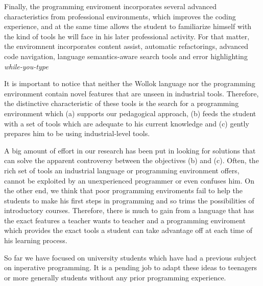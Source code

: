 Finally, the programming enviroment incorporates several advanced characteristics from professional environments, 
which improves the coding experience, and at the same time allows the student to familiarize himself with the kind of tools he will face in his later professional activity.
For that matter, the enviromnent incorporates content assist, automatic refactorings, advanced code navigation, 
language semantics-aware search tools and error highlighting \emph{while-you-type}

\medskip
It is important to notice that neither the Wollok language nor the programming environment contain novel features that are unseen in industrial tools.
Therefore, the distinctive characteristic of these tools is the search for a programming environment which 
(a) supports our pedagogical approach,
(b) feeds the student with a set of tools which are adequate to his current knowledge
and (c) gently prepares him to be using industrial-level tools.

A big amount of effort in our research has been put in looking for solutions that can solve the apparent controversy between the objectives (b) and (c).
Often, the rich set of tools an industrial language or programming environment offers, cannot be exploited by an unexperienced programmer or even confuses him.
On the other end, we think that poor programming enviroments fail to help the students to make his first steps in programming and so trims the possibilities of introductory courses.
Therefore, there is much to gain from a language that has the exact features a teacher wants to teacher
and a programming enviroment which provides the exact tools a student can take advantage off at each time of his learning process.

So far we have focused on university students which have had a previous subject on inperative programming.
It is a pending job to adapt these ideas to teenagers or more generally students without any prior programming experience.

